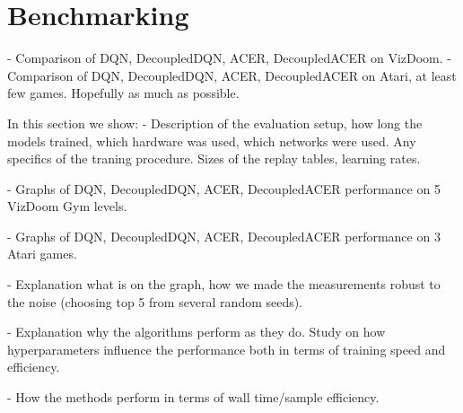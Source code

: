\section{Benchmarking}

- Comparison of DQN, DecoupledDQN, ACER, DecoupledACER on VizDoom.
- Comparison of DQN, DecoupledDQN, ACER, DecoupledACER on Atari, at least few
  games. Hopefully as much as possible.

In this section we show:
- Description of the evaluation setup, how long the models trained, which hardware was used,
which networks were used. Any specifics of the traning procedure. Sizes of the replay tables,
learning rates.

- Graphs of DQN, DecoupledDQN, ACER, DecoupledACER performance on 5 VizDoom Gym levels.

- Graphs of DQN, DecoupledDQN, ACER, DecoupledACER performance on 3 Atari games.

- Explanation what is on the graph, how we made the measurements robust to the noise (choosing top 5
from several random seeds).

- Explanation why the algorithms perform as they do. Study on how hyperparameters influence
the performance both in terms of training speed and efficiency.

- How the methods perform in terms of wall time/sample efficiency.
